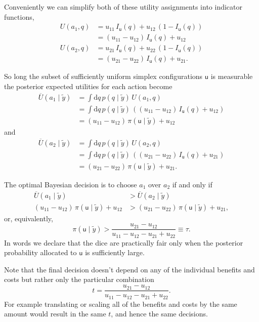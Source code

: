\documentclass[
  letterpaper,
  DIV=11,
  numbers=noendperiod]{scrartcl}
\begin{document}
Conveniently we can simplify both of these utility assignments into
indicator functions, \begin{align*}
U(a_{1}, q)
&=
u_{11} \, I_{\mathsf{u}}(q) +
u_{12} \, \left( 1 - I_{\mathsf{u}}(q) \right)
\\
&=
(u_{11} - u_{12}) \, I_{\mathsf{u}}(q) + u_{12}
\\
U(a_{2}, q)
&=
u_{21} \, I_{\mathsf{u}}(q) +
u_{22} \, \left( 1 - I_{\mathsf{u}}(q) \right)
\\
&=
(u_{21} - u_{22}) \, I_{\mathsf{u}}(q) + u_{21}.
\end{align*}

So long the subset of sufficiently uniform simplex configurations
\(\mathsf{u}\) is measurable the posterior expected utilities for each
action become \begin{align*}
\overline{U}(a_{1} \mid \tilde{y})
&=
\int \mathrm{d} q \, p(q \mid \tilde{y}) \, U(a_{1}, q)
\\
&=
\int \mathrm{d} q \, p(q \mid \tilde{y}) \,
\left( (u_{11} - u_{12}) \, I_{\mathsf{u}}(q) + u_{12} \right)
\\
&=
(u_{11} - u_{12}) \, \pi( \mathsf{u} \mid \tilde{y}) + u_{12}
\end{align*} and \begin{align*}
\overline{U}(a_{2} \mid \tilde{y})
&=
\int \mathrm{d} q \, p(q \mid \tilde{y}) \, U(a_{2}, q)
\\
&=
\int \mathrm{d} q \, p(q \mid \tilde{y}) \,
\left( (u_{21} - u_{22}) \, I_{\mathsf{u}}(q) + u_{21} \right)
\\
&=
(u_{21} - u_{22}) \, \pi( \mathsf{u} \mid \tilde{y}) + u_{21}.
\end{align*}

The optimal Bayesian decision is to choose \(a_{1}\) over \(a_{2}\) if
and only if \begin{align*}
\overline{U}(a_{1} \mid \tilde{y})
&>
\overline{U}(a_{2} \mid \tilde{y})
\\
(u_{11} - u_{12}) \, \pi( \mathsf{u} \mid \tilde{y}) + u_{12}
&>
(u_{21} - u_{22}) \, \pi( \mathsf{u} \mid \tilde{y}) + u_{21},
\end{align*} or, equivalently, \[
\pi( \mathsf{u} \mid \tilde{y})
>
\frac{ u_{21} - u_{12} }{ u_{11} - u_{12} - u_{21} + u_{22} }
\equiv
\tau.
\] In words we declare that the dice are practically fair only when the
posterior probability allocated to \(\mathsf{u}\) is sufficiently large.

Note that the final decision doesn't depend on any of the individual
benefits and costs but rather only the particular combination \[
t = \frac{ u_{21} - u_{12} }{ u_{11} - u_{12} - u_{21} + u_{22} }.
\] For example translating or scaling all of the benefits and costs by
the same amount would result in the same \(t\), and hence the same
decisions.
\end{document}

